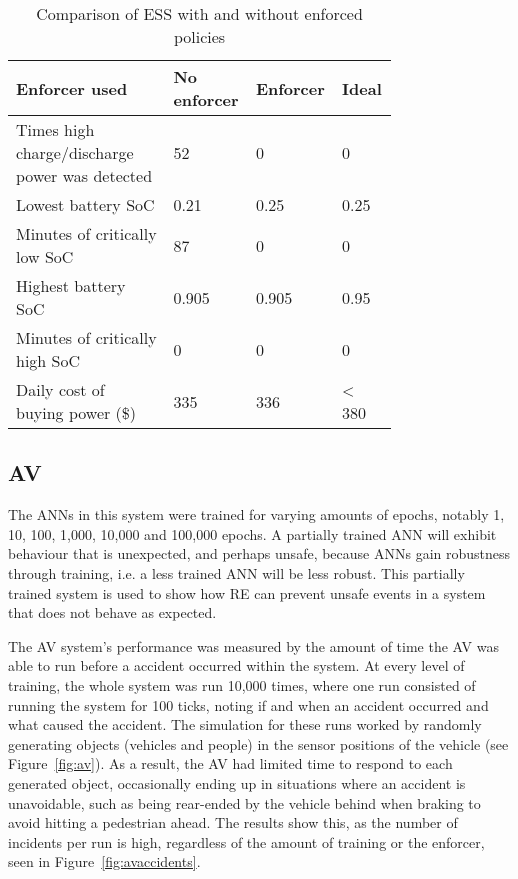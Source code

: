 \begin{table}[H]
	\centering
	\caption{Comparison of ESS with and without enforced policies}
	\label{table:essres}
	\begin{tabular}{|p{0.4\linewidth}|p{0.12\linewidth}|p{0.12\linewidth}|p{0.12\linewidth}|}
		\hline Enforcer used & No enforcer &  Enforcer & Ideal \\ \hline
		Times high charge/discharge power was detected & 52 & 0 & 0 \\ \hline      
		Lowest battery \ac{SoC} & 0.21 & 0.25 & 0.25 \\ \hline
		Minutes of critically low \ac{SoC} & 87 & 0 & 0 \\ \hline
		Highest battery \ac{SoC} & 0.905 & 0.905 & 0.95 \\ \hline
		Minutes of critically high \ac{SoC} & 0 & 0 & 0 \\ \hline
		Daily cost of buying power (\$) & 335 & 336 & < 380 \\ \hline 
	\end{tabular}
\end{table}

\subsection{\acf{AV}}
The \acp{ANN} in this system were trained for varying amounts of epochs, notably 1, 10, 100, 1,000, 10,000 and 100,000 epochs.
A partially trained \ac{ANN} will exhibit behaviour that is unexpected, and perhaps unsafe, because \acp{ANN} gain robustness through training, i.e. a less trained \ac{ANN} will be less robust.
This partially trained system is used to show how \ac{RE} can prevent unsafe events in a system that does not behave as expected.

The \ac{AV} system's performance was measured by the amount of time the \ac{AV} was able to run before a accident occurred within the system.
At every level of training, the whole system was run 10,000 times, where one run consisted of running the system for 100 ticks, noting if and when an accident occurred and what caused the accident. 
The simulation for these runs worked by randomly generating objects (vehicles and people) in the sensor positions of the vehicle (see Figure~\ref{fig:av}).
As a result, the \ac{AV} had limited time to respond to each generated object, occasionally ending up in situations where an accident is unavoidable, such as being rear-ended by the vehicle behind when braking to avoid hitting a pedestrian ahead.
The results show this, as the number of incidents per run is high, regardless of the amount of training or the enforcer, seen in Figure~\ref{fig:avaccidents}.

